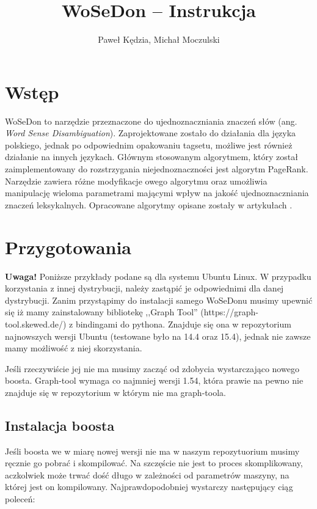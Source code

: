 \documentclass[10pt,a4paper]{article}
\author{Paweł Kędzia, Michał Moczulski}
\title{WoSeDon -- Instrukcja}
\begin{document}
\maketitle

\tableofcontents

\section{Wstęp}
WoSeDon to narzędzie przeznaczone do ujednoznaczniania znaczeń słów (ang. \textit{Word Sense Disambiguation}). Zaprojektowane zostało do działania dla języka polskiego, jednak po odpowiednim opakowaniu tagsetu, możliwe jest również działanie na innych językach. Głównym stosowanym algorytmem, który został zaimplementowany do rozstrzygania niejednoznaczności jest algorytm PageRank. Narzędzie zawiera różne modyfikacje owego algorytmu oraz umożliwia manipulację wieloma parametrami mającymi wpływ na jakość ujednoznaczniania znaczeń leksykalnych.
Opracowane algorytmy opisane zostały w artykułach \cite{KedziaCS2015, Kedzia2014, PiaseckiGWC2016}.


\section{Przygotowania}
\textbf{Uwaga!} Poniższe przykłady podane są dla systemu Ubuntu Linux. W przypadku korzystania z innej dystrybucji, należy zastąpić je odpowiednimi dla danej dystrybucji.
Zanim przystąpimy do instalacji samego WoSeDonu musimy upewnić się iż mamy zainstalowany bibliotekę ,,Graph Tool'' (https://graph-tool.skewed.de/) z bindingami do pythona. Znajduje się ona w repozytorium najnowszych wersji Ubuntu (testowane było na 14.4 oraz 15.4), jednak nie zawsze mamy możliwość z niej skorzystania.

Jeśli rzeczywiście jej nie ma musimy zacząć od zdobycia wystarczająco nowego boosta. Graph-tool wymaga co najmniej wersji 1.54, która prawie na pewno nie znajduje się w repozytorium w którym nie ma graph-toola.

\subsection{Instalacja boosta}
Jeśli boosta we w miarę nowej wersji nie ma w naszym repozytuorium musimy ręcznie go pobrać i skompilować. Na szczęście nie jest to proces skomplikowany, aczkolwiek może trwać dość długo w zależności od parametrów maszyny, na której jest on kompilowany. Najprawdopodobniej wystarczy następujący ciąg poleceń:
\end{document}

